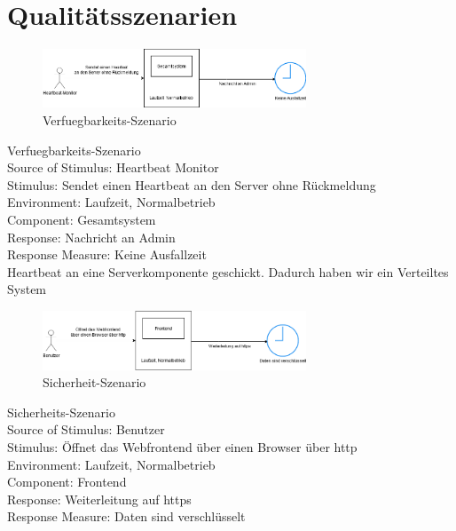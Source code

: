 \chapter{Qualitätsszenarien}
\label{ch:Qualitaetsszenarien}


\begin{figure}[tbh]
  \centering
  \includegraphics[width=0.7\textwidth]{Graphics/Verfuegbarkeit.png}
  \caption{Verfuegbarkeits-Szenario}
  \label{fig:Qualitaet1}
\end{figure}

Verfuegbarkeits-Szenario\\
Source of Stimulus: Heartbeat Monitor\\
Stimulus: Sendet einen Heartbeat an den Server ohne Rückmeldung\\
Environment: Laufzeit, Normalbetrieb\\
Component: Gesamtsystem\\
Response: Nachricht an Admin\\
Response Measure: Keine Ausfallzeit\\

Heartbeat an eine Serverkomponente geschickt.  Dadurch haben wir ein Verteiltes System



\begin{figure}[tbh]
  \centering
  \includegraphics[width=0.7\textwidth]{Graphics/Sicherheit.png}
  \caption{Sicherheit-Szenario}
  \label{fig:Qualitaet2}
\end{figure}


Sicherheits-Szenario\\
Source of Stimulus: Benutzer\\
Stimulus: Öffnet das Webfrontend über einen Browser über http\\
Environment: Laufzeit, Normalbetrieb\\
Component: Frontend\\
Response: Weiterleitung auf https\\
Response Measure: Daten sind verschlüsselt\\





